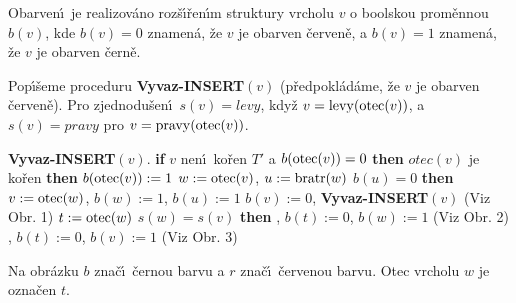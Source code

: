 \flushpar Obarven\'\i\ je realizov\'ano roz\v s\'\i\v ren\'\i m struktury vrcholu $v$ 
o boolskou prom\v ennou $b(v)$, kde $b(v)=0$ znamen\'a, \v ze $v$ je obarven 
\v cerven\v e, a $b(v)=1$ znamen\'a, \v ze $v$ je obarven \v cern\v e.
\medskip

\flushpar Pop\'\i\v seme proceduru {\bf Vyvaz-INSERT$(v)$} (p\v redpokl\'ad\'ame, \v ze 
$v$ je obarven \v cerven\v e). Pro zjednodu\v sen\'\i\ $s(v
)=levy$, kdy\v z $v=\operatorname{levy}(\operatorname{otec}(v))$, a $s(v)=pravy$ pro  
$v=\operatorname{pravy}(\operatorname{otec}(v))$.
\bigskip

{\bf Vyvaz-INSERT$(v)$}.\newline 
{\bf if} $v$ nen\'\i\ ko\v ren $T'$ a $b(\operatorname{otec}(v))=0$ {\bf then}\newline 
\phantom{---}{\bf if} $otec(v)$ je ko\v ren {\bf then}\newline 
\phantom{------}$b(\operatorname{otec}(v)):=1$\newline 
\phantom{---}{\bf else}\newline 
\phantom{------}$w:=\operatorname{otec}(v)$, $u:=\operatorname{bratr}(w)$\newline 
\phantom{------}{\bf if} $b(u)=0$ {\bf then}\newline 
\phantom{---------}$v:=\operatorname{otec}(w)$, $b(w):=1$, $b(u):=1$\newline 
\phantom{---------}$b(v):=0$, {\bf Vyvaz-INSERT$(v)$} (Viz Obr. 1)\newline 
\phantom{------}{\bf else}\newline 
\phantom{---------}$t:=\operatorname{otec}(w)$\newline 
\phantom{---------}{\bf if} $s(w)=s(v)$ {\bf then}\newline 
\phantom{------------}{\bf Rotace$(t,w)$}, $b(t):=0$, $b(w):=1$ (Viz Obr. 2)\newline 
\phantom{---------}{\bf else}\newline 
\phantom{------------}{\bf Dvojita-rotace$(t,w,v)$}, $b(t):=0$, $b(v):=1$ (Viz Obr. 3)\newline 
\phantom{---------}{\bf endif}\newline 
\phantom{------}{\bf endif}\newline 
\phantom{---}{\bf endif\newline 
endif}
\medskip

\flushpar Na obr\'azku $b$ zna\v c\'\i\ \v cernou barvu a $r$ zna\v c\'\i\ \v cervenou 
barvu. Otec vrcholu $w$ je ozna\v cen $t$. 
\medskip

\midinsert
\centerline{}
\endcaption
\endinsert

